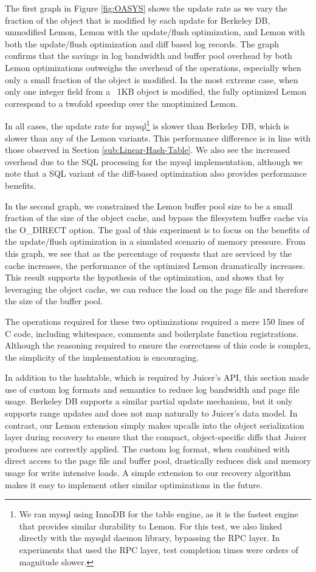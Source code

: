 \documentclass[10pt,letterpaper,twocolumn,english]{article}
\newcommand{\yad}{Lemon\xspace}
\newcommand{\oasys}{Juicer\xspace}
\begin{document}
The first graph in Figure \ref{fig:OASYS} shows the update rate as we
vary the fraction of the object that is modified by each update for
Berkeley DB, unmodified \yad, \yad with the update/flush optimization,
and \yad with both the update/flush optimization and diff based log
records.
The graph confirms that the savings in log bandwidth and
buffer pool overhead by both \yad optimizations 
outweighs the overhead of the operations, especially when only a small
fraction of the object is modified.
In the most extreme case, when
only one integer field from a ~1KB object is modified, the fully
optimized \yad correspond to a twofold speedup over the unoptimized
\yad.

In all cases, the update rate for mysql\footnote{We ran mysql using
InnoDB for the table engine, as it is the fastest engine that provides
similar durability to \yad. For this test, we also linked directly
with the mysqld daemon library, bypassing the RPC layer. In
experiments that used the RPC layer, test completion times were orders
of magnitude slower.} is slower than Berkeley DB,
which is slower than any of the \yad variants. This performance
difference is in line with those observed in Section
\ref{sub:Linear-Hash-Table}. We also see the increased overhead due to
the SQL processing for the mysql implementation, although we note that
a SQL variant of the diff-based optimization also provides performance
benefits.

In the second graph, we constrained the \yad buffer pool size to be a
small fraction of the size of the object cache, and bypass the filesystem
buffer cache via the O\_DIRECT option. The goal of this experiment is to
focus on the benefits of the update/flush optimization in a simulated
scenario of memory pressure. From this graph, we see that as the percentage of
requests that are serviced by the cache increases, the
performance of the optimized \yad dramatically increases.
This result supports the hypothesis of the optimization, and
shows that by leveraging the object cache, we can reduce the load on
the page file and therefore the size of the buffer pool.

The operations required for these
two optimizations required a mere 150 lines of C code, including
whitespace, comments and boilerplate function registrations.  Although
the reasoning required to ensure the correctness of this code is
complex, the simplicity of the implementation is encouraging.

In addition to the hashtable, which is required by \oasys's API, this
section made use of custom log formats and semantics to reduce log
bandwidth and page file usage.  Berkeley DB supports a similar
partial update mechanism, but it only
supports range updates and does not map naturally to \oasys's data
model.  In contrast, our \yad extension simply makes upcalls
into the object serialization layer during recovery to ensure that the
compact, object-specific diffs that \oasys produces are correctly
applied.  The custom log format, when combined with direct access to
the page file and buffer pool, drastically reduces disk and memory usage
for write intensive loads. A simple extension to our recovery algorithm makes it
easy to implement other similar optimizations in the future.
\end{document}
